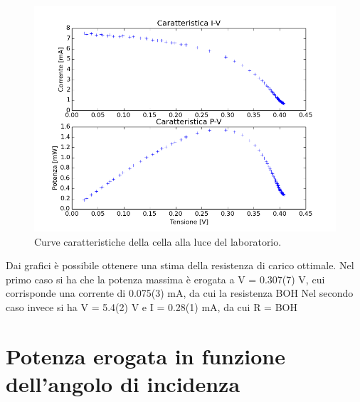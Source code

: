 \documentclass[journal, a4paper]{IEEEtran}
\begin{document}
\begin{figure}[htp]
\centering
\includegraphics[scale=.45]{es4_luceled}
\caption{Curve caratteristiche della cella alla luce del laboratorio.}
\label{fig:led}
\end{figure}

Dai grafici è possibile ottenere una stima della resistenza di carico ottimale. Nel primo caso si ha che la potenza massima è erogata a V = 0.307(7) V, cui corrisponde una corrente di 0.075(3) mA, da cui la resistenza BOH
Nel secondo caso invece si ha V = 5.4(2) V e I = 0.28(1) mA, da cui R = BOH



\section{Potenza erogata in funzione dell'angolo di incidenza}
\end{document}

